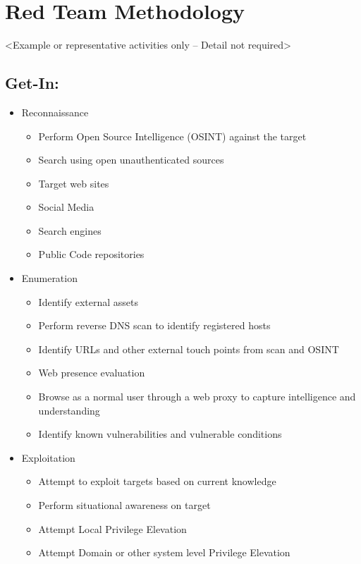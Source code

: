 \documentclass[12pt,letterpaper]{article}
\begin{document}
\section{Red Team Methodology}
<Example or representative activities only – Detail not required>

\subsection{Get-In:}
\begin{itemize}
    \item Reconnaissance
    \begin{itemize}
        \item Perform Open Source Intelligence (OSINT) against the target
        \item Search using open unauthenticated sources
        \item Target web sites
        \item Social Media
        \item Search engines
        \item Public Code repositories
    \end{itemize}
    
    \item Enumeration
    \begin{itemize}
        \item Identify external assets
        \item Perform reverse DNS scan to identify registered hosts
        \item Identify URLs and other external touch points from scan and OSINT
        \item Web presence evaluation
        \item Browse as a normal user through a web proxy to capture intelligence and understanding
        \item Identify known vulnerabilities and vulnerable conditions
    \end{itemize}
    
    \item Exploitation
    \begin{itemize}
        \item Attempt to exploit targets based on current knowledge
        \item Perform situational awareness on target
        \item Attempt Local Privilege Elevation
        \item Attempt Domain or other system level Privilege Elevation
    \end{itemize}
\end{itemize}
\end{document}
